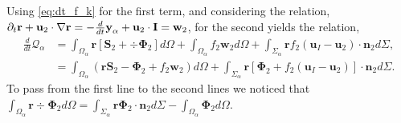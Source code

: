 Using \ref{eq:dt_f_k} for the first term, and considering the relation,
$  \partial_t \textbf{r}
+ \textbf{u}_2 \cdot \mathbf{\nabla} \textbf{r}
= - \frac{d}{dt} \textbf{y}_\alpha  + \textbf{u}_2 \cdot \textbf{I}
= \textbf{w}_2$,
for the second yields the relation,
\begin{align*}
    \frac{d}{dt} \mathcal{Q}_\alpha
    &= \int_{\Omega_\alpha} \textbf{r} \left[
         \textbf{S}_2 +  \div \mathbf{\Phi}_2
    \right]d\Omega
    +\int_{\Omega_\alpha} f_2  \textbf{w}_2 d\Omega
    + \int_{\Sigma_\alpha} \textbf{r}  f_2 (\textbf{u}_I-\textbf{u}_2)\cdot \textbf{n}_2  d\Sigma,\\
    &= \int_{\Omega_\alpha} \left( 
        \textbf{r} \textbf{S}_2 
        - \mathbf{\Phi}_2
        + f_2  \textbf{w}_2 
    \right) d\Omega
    + \int_{\Sigma_\alpha} \textbf{r} \left[
        \mathbf{\Phi}_2
        + f_2 (\textbf{u}_I-\textbf{u}_2)
    \right]\cdot \textbf{n}_2  d\Sigma.
\end{align*}
To pass from the first line to the second lines we noticed that $\int_{\Omega_\alpha} \textbf{r}  \div \mathbf{\Phi}_2 d\Omega
= \int_{\Sigma_\alpha} \textbf{r} \mathbf{\Phi}_2 \cdot \textbf{n}_2 d\Sigma
- \int_{\Omega_\alpha} \mathbf{\Phi}_2 d\Omega$. 





